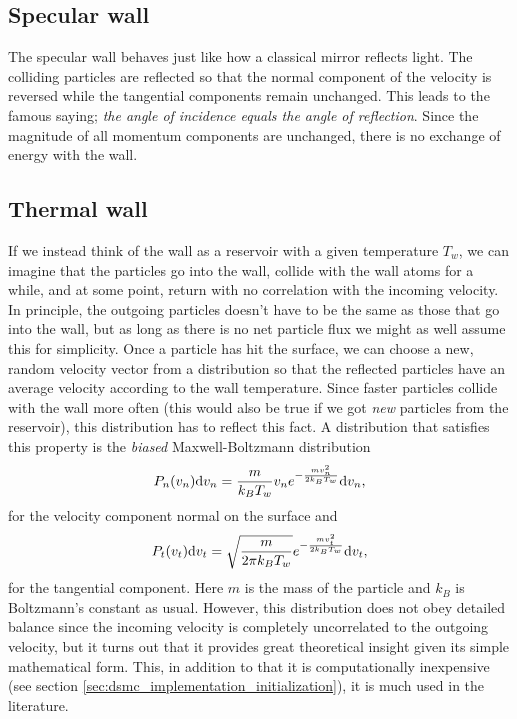 \subsection{Specular wall}
The specular wall behaves just like how a classical mirror reflects light. The colliding particles are reflected so that the normal component of the velocity is reversed while the tangential components remain unchanged. This leads to the famous saying; \textit{the angle of incidence equals the angle of reflection}. Since the magnitude of all momentum components are unchanged, there is no exchange of energy with the wall. 

\subsection{Thermal wall}
If we instead think of the wall as a reservoir with a given temperature $T_w$, we can imagine that the particles go into the wall, collide with the wall atoms for a while, and at some point, return with no correlation with the incoming velocity. In principle, the outgoing particles doesn't have to be the same as those that go into the wall, but as long as there is no net particle flux we might as well assume this for simplicity. Once a particle has hit the surface, we can choose a new, random velocity vector from a distribution so that the reflected particles have an average velocity according to the wall temperature. Since faster particles collide with the wall more often (this would also be true if we got \textit{new} particles from the reservoir), this distribution has to reflect this fact. A distribution that satisfies this property is the \textit{biased} Maxwell-Boltzmann distribution\cite{alexander1997direct} 
\begin{align}
	P_n(v_n)\mathrm{d}v_n = {m\over k_BT_w}v_n e^{-\frac{mv_n^2}{2k_BT_w}} \mathrm{d}v_n,
\end{align}
for the velocity component normal on the surface and
\begin{align}
	P_t(v_t)\mathrm{d}v_t = \sqrt{m\over 2\pi k_BT_w}e^{-\frac{mv_t^2}{2k_BT_w}} \mathrm{d}v_t,
\end{align}
for the tangential component. Here $m$ is the mass of the particle and $k_B$ is Boltzmann's constant as usual. However, this distribution does not obey detailed balance since the incoming velocity is completely uncorrelated to the outgoing velocity, but it turns out that it provides great theoretical insight given its simple mathematical form. This, in addition to that it is computationally inexpensive (see section \ref{sec:dsmc_implementation_initialization}), it is much used in the literature. 
